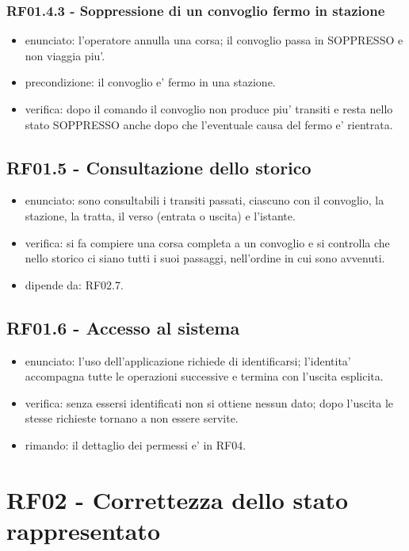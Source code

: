 \documentclass[11pt]{article}
\begin{document}
\subsubsection{RF01.4.3 - Soppressione di un convoglio fermo in stazione}
\label{sec:orgfcbd9f9}
\begin{itemize}
\item enunciato: l'operatore annulla una corsa; il convoglio passa in SOPPRESSO e non viaggia piu'.
\item precondizione: il convoglio e' fermo in una stazione.
\item verifica: dopo il comando il convoglio non produce piu' transiti e resta nello stato SOPPRESSO
anche dopo che l'eventuale causa del fermo e' rientrata.
\end{itemize}
\subsection{RF01.5 - Consultazione dello storico}
\label{sec:org659d3b9}

\begin{itemize}
\item enunciato: sono consultabili i transiti passati, ciascuno con il convoglio, la stazione, la tratta,
il verso (entrata o uscita) e l'istante.
\item verifica: si fa compiere una corsa completa a un convoglio e si controlla che nello storico ci
siano tutti i suoi passaggi, nell'ordine in cui sono avvenuti.
\item dipende da: RF02.7.
\end{itemize}
\subsection{RF01.6 - Accesso al sistema}
\label{sec:orgce244eb}

\begin{itemize}
\item enunciato: l'uso dell'applicazione richiede di identificarsi; l'identita' accompagna tutte le
operazioni successive e termina con l'uscita esplicita.
\item verifica: senza essersi identificati non si ottiene nessun dato; dopo l'uscita le stesse richieste
tornano a non essere servite.
\item rimando: il dettaglio dei permessi e' in RF04.
\end{itemize}
\section{RF02 - Correttezza dello stato rappresentato}
\label{sec:org74119a4}
\end{document}
